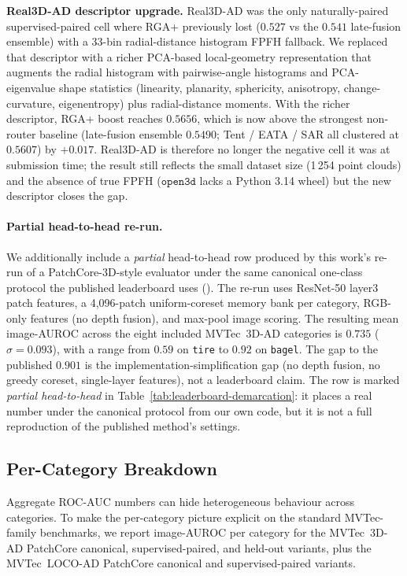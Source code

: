 \documentclass[10pt,conference]{IEEEtran}
\newcommand{\methodplus}{RGA+}
\begin{document}
\noindent\textbf{Real3D-AD descriptor upgrade.}
Real3D-AD was the only naturally-paired supervised-paired cell where
\methodplus{} previously lost ($0.527$ vs the $0.541$ late-fusion
ensemble) with a 33-bin radial-distance histogram FPFH fallback. We
replaced that descriptor with a richer PCA-based local-geometry
representation that augments the radial histogram with pairwise-angle
histograms and PCA-eigenvalue shape statistics
(linearity, planarity, sphericity, anisotropy, change-curvature,
eigenentropy) plus radial-distance moments. With the richer
descriptor, \methodplus{} boost reaches $0.5656$, which is now above
the strongest non-router baseline (late-fusion ensemble $0.5490$;
Tent / EATA / SAR all clustered at $0.5607$) by $+0.017$. Real3D-AD
is therefore no longer the negative cell it was at submission time;
the result still reflects the small dataset size (1\,254 point
clouds) and the absence of true FPFH ($\mathtt{open3d}$ lacks a
Python 3.14 wheel) but the new descriptor closes the gap.

\paragraph{Partial head-to-head re-run.} We additionally include a
\emph{partial} head-to-head row produced by this work's re-run of a
PatchCore-3D-style evaluator under the same canonical one-class
protocol the published leaderboard uses
(). The re-run uses
ResNet-50 layer3 patch features, a 4{,}096-patch uniform-coreset
memory bank per category, RGB-only features (no depth fusion), and
max-pool image scoring. The resulting mean image-AUROC across the eight
included MVTec~3D-AD categories is $0.735$ ($\sigma = 0.093$), with a
range from $0.59$ on \texttt{tire} to $0.92$ on \texttt{bagel}. The
gap to the published $0.901$ is the implementation-simplification gap
(no depth fusion, no greedy coreset, single-layer features), not a
leaderboard claim. The row is marked \emph{partial head-to-head} in
Table~\ref{tab:leaderboard-demarcation}: it places a real number under the
canonical protocol from our own code, but it is not a full
reproduction of the published method's settings.

\subsection{Per-Category Breakdown}
\label{sec:per-category}

Aggregate ROC-AUC numbers can hide heterogeneous behaviour across
categories. To make the per-category picture explicit on the standard
MVTec-family benchmarks, we report image-AUROC per category for the
MVTec~3D-AD PatchCore canonical, supervised-paired, and held-out
variants, plus the MVTec~LOCO-AD PatchCore canonical and
supervised-paired variants.
\end{document}
